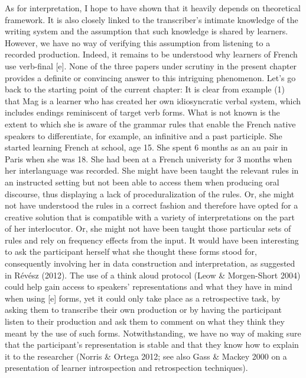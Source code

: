 \documentclass[11pt]{article}
\newenvironment{styleStandard}{\renewcommand\baselinestretch{1.0}\setlength\leftskip{0cm}\setlength\rightskip{0cm plus 1fil}\setlength\parindent{0cm}\setlength\parfillskip{0pt plus 1fil}\setlength\parskip{0in plus 1pt}\writerlistparindent\writerlistleftskip\leavevmode\normalfont\normalsize\writerlistlabel\ignorespaces}{\unskip\vspace{0.111in plus 0.0111in}\par}
\newcommand\writerlistleftskip{}
\newcommand\writerlistparindent{}
\newcommand\writerlistlabel{}
\begin{document}
\begin{styleStandard}
As for interpretation, I hope to have shown that it heavily depends on theoretical framework. It is also closely linked to the transcriber’s intimate knowledge of the writing system and the assumption that such knowledge is shared by learners. However, we have no way of verifying this assumption from listening to a recorded production. Indeed, it remains to be understood why learners of French use verb-final [e]. None of the three papers under scrutiny in the present chapter provides a definite or convincing answer to this intriguing phenomenon. Let’s go back to the starting point of the current chapter: It is clear from example (1) that Mag is a learner who has created her own idiosyncratic verbal system, which includes endings reminiscent of target verb forms. What is not known is the extent to which she is aware of the grammar rules that enable the French native speakers to differentiate, for example, an infinitive and a past participle. She started learning French at school, age 15. She spent 6 months as an au pair in Paris when she was 18. She had been at a French univeristy for 3 months when her interlanguage was recorded. She might have been taught the relevant rules in an instructed setting but not been able to access them when producing oral discourse, thus displaying a lack of proceduralization of the rules. Or, she might not have understood the rules in a correct fashion and therefore have opted for a creative solution that is compatible with a variety of interpretations on the part of her interlocutor. Or, she might not have been taught those particular sets of rules and rely on frequency effects from the input. It would have been interesting to ask the participant herself what she thought these forms stood for, consequently involving her in data construction and interpretation, as suggested in Révész (2012). The use of a think aloud protocol (Leow \& Morgen-Short 2004) could help gain access to speakers’ representations and what they have in mind when using [e] forms, yet it could only take place as a retrospective task, by asking them to transcribe their own production or by having the participant listen to their production and ask them to comment on what they think they meant by the use of such forms. Notwithstanding, we have no way of making sure that the participant’s representation is stable and that they know how to explain it to the researcher (Norris \& Ortega 2012; see also Gass \& Mackey 2000 on a presentation of learner introspection and retrospection techniques). 
\end{styleStandard}
\end{document}
